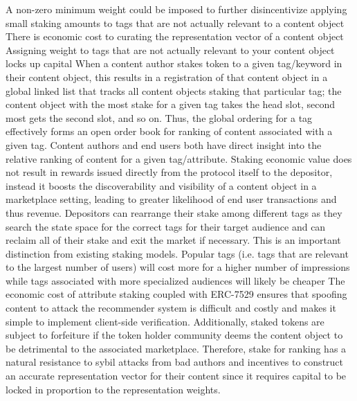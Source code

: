 A non-zero minimum weight could be imposed to further disincentivize applying small staking amounts to tags that are not actually relevant to a content object
There is economic cost to curating the representation vector of a content object
Assigning weight to tags that are not actually relevant to your content object locks up capital 
When a content author stakes token to a given tag/keyword in their content object, this results in a registration of that content object in a global linked list that tracks all content objects staking that particular tag; the content object with the most stake for a given tag takes the head slot, second most gets the second slot, and so on. 
Thus, the global ordering for a tag effectively forms an open order book for ranking of content associated with a given tag. Content authors and end users both have direct insight into the relative ranking of content for a given tag/attribute. 
Staking economic value does not result in rewards issued directly from the protocol itself to the depositor, instead it boosts the discoverability and visibility of a content object in a marketplace setting, leading to greater likelihood of end user transactions and thus revenue. Depositors can rearrange their stake among different tags as they search the state space for the correct tags for their target audience and can reclaim all of their stake and exit the market if necessary. This is an important distinction from existing staking models. 
Popular tags (i.e. tags that are relevant to the largest number of users) will cost more for a higher number of impressions while tags associated with more specialized audiences will likely be cheaper
The economic cost of attribute staking coupled with ERC-7529 ensures that spoofing content to attack the recommender system is difficult and costly and makes it simple to implement client-side verification. Additionally, staked tokens are subject to forfeiture if the token holder community deems the content object to be detrimental to the associated marketplace. Therefore, stake for ranking has a natural resistance to sybil attacks from bad authors and incentives to construct an accurate representation vector for their content since it requires capital to be locked in proportion to the representation weights. 

